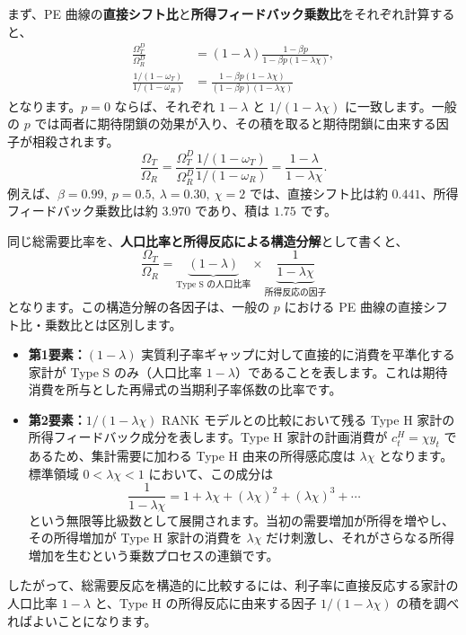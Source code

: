 \documentclass[
  japanese,
  lualatex,
  ja=standard,
  12pt,
  a4paper]{ltjsarticle}
\providecommand{\tightlist}{%
  \setlength{\itemsep}{0pt}\setlength{\parskip}{0pt}}
\begin{document}
まず、PE
曲線の\textbf{直接シフト比}と\textbf{所得フィードバック乗数比}をそれぞれ計算すると、
\[
\begin{aligned}
\frac{\Omega_T^D}{\Omega_R^D}
&=(1-\lambda)\frac{1-\beta p}{1-\beta p(1-\lambda\chi)},
\\[4pt]
\frac{1/(1-\omega_T)}{1/(1-\omega_R)}
&=\frac{1-\beta p(1-\lambda\chi)}{(1-\beta p)(1-\lambda\chi)}
\end{aligned}
\] となります。\(p=0\) ならば、それぞれ \(1-\lambda\) と
\(1/(1-\lambda\chi)\) に一致します。一般の \(p\)
では両者に期待閉鎖の効果が入り、その積を取ると期待閉鎖に由来する因子が相殺されます。
\[
\frac{\Omega_T}{\Omega_R}
=\frac{\Omega_T^D}{\Omega_R^D}
\frac{1/(1-\omega_T)}{1/(1-\omega_R)}
=\frac{1-\lambda}{1-\lambda\chi}.
\] 例えば、\(\beta=0.99,\ p=0.5,\ \lambda=0.30,\ \chi=2\)
では、直接シフト比は約 \(0.441\)、所得フィードバック乗数比は約 \(3.970\)
であり、積は \(1.75\) です。

同じ総需要比率を、\textbf{人口比率と所得反応による構造分解}として書くと、
\[
\frac{\Omega_T}{\Omega_R}
=
\underbrace{(1-\lambda)}_{\text{Type S の人口比率}}
\times
\underbrace{\frac{1}{1-\lambda\chi}}_{\text{所得反応の因子}}
\] となります。この構造分解の各因子は、一般の \(p\) における PE
曲線の直接シフト比・乗数比とは区別します。

\begin{itemize}
\tightlist
\item
  \textbf{第1要素：\((1-\lambda)\)}
  実質利子率ギャップに対して直接的に消費を平準化する家計が Type S
  のみ（人口比率
  \(1-\lambda\)）であることを表します。これは期待消費を所与とした再帰式の当期利子率係数の比率です。
\item
  \textbf{第2要素：\(1/(1-\lambda\chi)\)} RANK
  モデルとの比較において残る Type H
  家計の所得フィードバック成分を表します。Type H 家計の計画消費が
  \(c_t^H = \chi y_t\) であるため、集計需要に加わる Type H
  由来の所得感応度は \(\lambda\chi\) となります。標準領域
  \(0 < \lambda\chi < 1\) において、この成分は \[
  \frac{1}{1-\lambda\chi} = 1 + \lambda\chi + (\lambda\chi)^2 + (\lambda\chi)^3 + \cdots
  \]
  という無限等比級数として展開されます。当初の需要増加が所得を増やし、その所得増加が
  Type H 家計の消費を \(\lambda\chi\)
  だけ刺激し、それがさらなる所得増加を生むという乗数プロセスの連鎖です。
\end{itemize}

したがって、総需要反応を構造的に比較するには、利子率に直接反応する家計の人口比率
\(1-\lambda\) と、Type H の所得反応に由来する因子 \(1/(1-\lambda\chi)\)
の積を調べればよいことになります。
\end{document}
